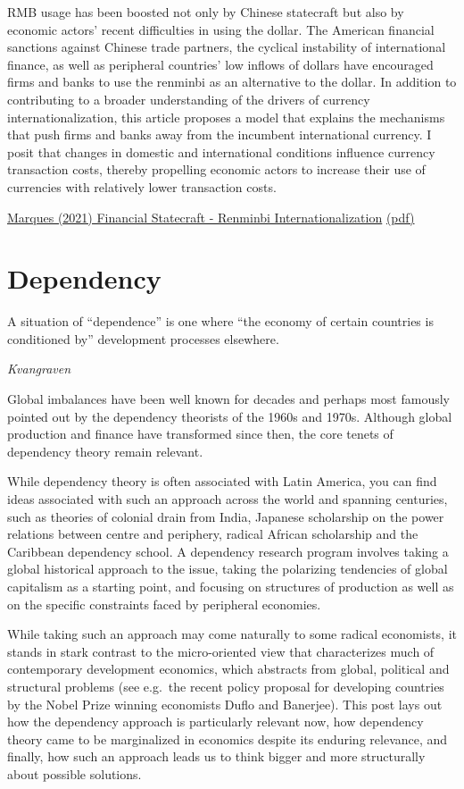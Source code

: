 \documentclass[
]{book}
\begin{document}
RMB usage has been boosted not only by Chinese
statecraft but also by economic actors' recent difficulties in using the dollar. The
American financial sanctions against Chinese trade partners, the cyclical
instability of international finance, as well as peripheral countries' low inflows of
dollars have encouraged firms and banks to use the renminbi as an alternative to
the dollar. In addition to contributing to a broader understanding of the drivers of
currency internationalization, this article proposes a model that explains the
mechanisms that push firms and banks away from the incumbent international
currency. I posit that changes in domestic and international conditions influence
currency transaction costs, thereby propelling economic actors to increase their
use of currencies with relatively lower transaction costs.

\href{https://refubium.fu-berlin.de/handle/fub188/30516}{Marques (2021) Financial Statecraft - Renminbi Internationalization}
\href{pdf/Marques_2021_Renminbi.pdf}{(pdf)}

\hypertarget{dependency}{%
\chapter{Dependency}\label{dependency}}

A situation of ``dependence'' is one where ``the economy of certain countries is conditioned by'' development processes elsewhere.

\emph{Kvangraven}

Global imbalances have been well known for decades and perhaps most famously pointed out by the dependency theorists of the 1960s and 1970s. Although global production and finance have transformed since then, the core tenets of dependency theory remain relevant.

While dependency theory is often associated with Latin America, you can find ideas associated with such an approach across the world and spanning centuries, such as theories of colonial drain from India, Japanese scholarship on the power relations between centre and periphery, radical African scholarship and the Caribbean dependency school. A dependency research program involves taking a global historical approach to the issue, taking the polarizing tendencies of global capitalism as a starting point, and focusing on structures of production as well as on the specific constraints faced by peripheral economies.

While taking such an approach may come naturally to some radical economists, it stands in stark contrast to the micro-oriented view that characterizes much of contemporary development economics, which abstracts from global, political and structural problems (see e.g.~the recent policy proposal for developing countries by the Nobel Prize winning economists Duflo and Banerjee). This post lays out how the dependency approach is particularly relevant now, how dependency theory came to be marginalized in economics despite its enduring relevance, and finally, how such an approach leads us to think bigger and more structurally about possible solutions.
\end{document}
